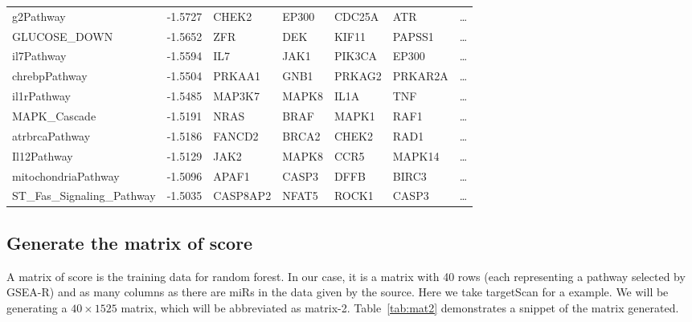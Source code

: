 \documentclass{scrartcl}
\numberwithin{figure}{section}
\numberwithin{table}{section}
\begin{document}
\begin{table}[h!]
\begin{tabular}{lllllll}
  g2Pathway                                                 & -1.5727 & CHEK2    & EP300   & CDC25A  & ATR     & \dots \\
  GLUCOSE\_DOWN                                             & -1.5652 & ZFR      & DEK     & KIF11   & PAPSS1  & \dots \\
  il7Pathway                                                & -1.5594 & IL7      & JAK1    & PIK3CA  & EP300   & \dots \\
  chrebpPathway                                             & -1.5504 & PRKAA1   & GNB1    & PRKAG2  & PRKAR2A & \dots \\
  il1rPathway                                               & -1.5485 & MAP3K7   & MAPK8   & IL1A    & TNF     & \dots \\
  MAPK\_Cascade                                             & -1.5191 & NRAS     & BRAF    & MAPK1   & RAF1    & \dots \\
  atrbrcaPathway                                            & -1.5186 & FANCD2   & BRCA2   & CHEK2   & RAD1    & \dots \\
  Il12Pathway                                               & -1.5129 & JAK2     & MAPK8   & CCR5    & MAPK14  & \dots \\
  mitochondriaPathway                                       & -1.5096 & APAF1    & CASP3   & DFFB    & BIRC3   & \dots \\
  ST\_Fas\_Signaling\_Pathway                               & -1.5035 & CASP8AP2 & NFAT5   & ROCK1   & CASP3   & \dots \\
\bottomrule
\end{tabular}
\end{table}


\subsection{Generate the matrix of score}

A matrix of score is the training data for random forest. In our case, it is a
matrix with 40 rows (each representing a pathway selected by GSEA-R) and as
many columns as there are miRs in the data given by the source.  Here we take
targetScan for a example. We will be generating a $40\times1525$ matrix, which
will be abbreviated as matrix-2.  Table~\ref{tab:mat2} demonstrates a snippet
of the matrix generated.
\end{document}
